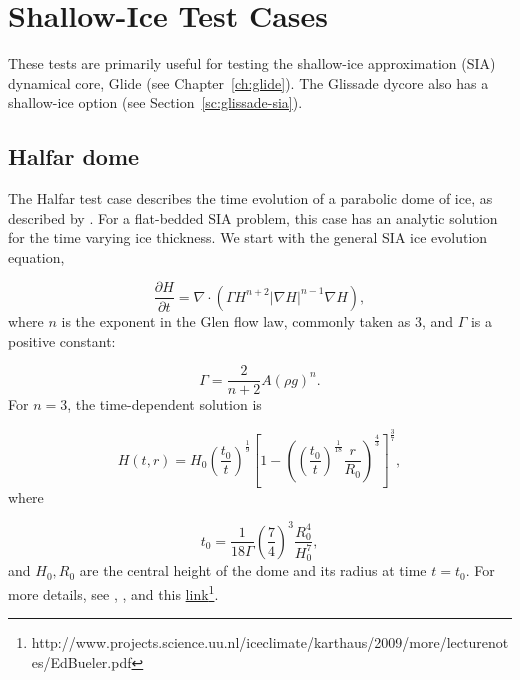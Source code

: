 
\section{Shallow-Ice Test Cases}
\label{sc:sia-tests}

These tests are primarily useful for testing the shallow-ice approximation (SIA) dynamical core, Glide (see Chapter~\ref{ch:glide}).
The Glissade dycore also has a shallow-ice option (see Section~\ref{sc:glissade-sia}).

\subsection{Halfar dome}

\label{sec:halfar_description}
The Halfar test case describes the time evolution of a parabolic dome of ice, as described by \citet{Halfar1983}.
For a flat-bedded SIA problem, this case has an analytic solution for the time varying ice thickness. We start with the
general SIA ice evolution equation,  

\begin{equation}
    \label{halfar}
    \frac{\partial H}{\partial t} = \nabla \cdot (\Gamma H^{n+2} |\nabla H|^{n-1} \nabla H),
\end{equation}
%
where $n$ is the exponent in the Glen flow law, commonly taken as 3, and $\Gamma$ is a positive constant:

\begin{equation}
    \Gamma = \frac{2}{n+2} A (\rho g)^n.
\end{equation}
%
For $n=3$, the time-dependent solution is

\begin{equation}
    H(t,r) = H_0 \left(\frac{t_0}{t}\right)^\frac{1}{9}  \left[ 1 - \left(  \left( \frac{t_0}{t} \right) ^ \frac{1}{18} \frac{r}{R_0} \right)^\frac{4}{3} \right] ^ \frac{3}{7},
\end{equation}
%
where

\begin{equation}
    t_0 = \frac{1}{18\Gamma} \left( \frac{7}{4} \right)^3 \frac{R_0^4}{H_0^7},
\end{equation}
%
and $H_0, R_0$ are the central height of the dome and its radius at time $t=t_0$.
For more details, see \citet{Halfar1983}, \citet{Bueler2005}, and this \href{http://www.projects.science.uu.nl/iceclimate/karthaus/2009/more/lecturenotes/EdBueler.pdf}{link}\footnote{http://www.projects.science.uu.nl/iceclimate/karthaus/2009/more/lecturenotes/EdBueler.pdf}.

